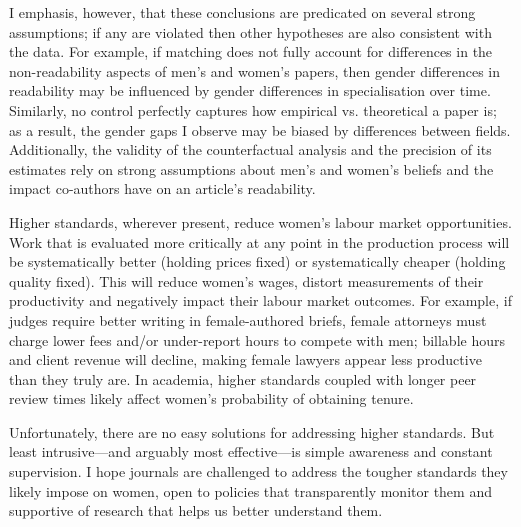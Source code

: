 I emphasis, however, that these conclusions are predicated on several strong assumptions; if any are violated then other hypotheses are also consistent with the data. For example, if matching does not fully account for differences in the non-readability aspects of men's and women's papers, then gender differences in readability may be influenced by gender differences in specialisation over time. Similarly, no control perfectly captures how empirical vs. theoretical a paper is; as a result, the gender gaps I observe may be biased by differences between fields. Additionally, the validity of the counterfactual analysis and the precision of its estimates rely on strong assumptions about men's and women's beliefs and the impact co-authors have on an article's readability.

Higher standards, wherever present, reduce women's labour market opportunities. Work that is evaluated more critically at any point in the production process will be systematically better (holding prices fixed) or systematically cheaper (holding quality fixed). This will reduce women's wages, distort measurements of their productivity and negatively impact their labour market outcomes. For example, if judges require better writing in female-authored briefs, female attorneys must charge lower fees and\slash or under-report hours to compete with men; billable hours and client revenue will decline, making female lawyers appear less productive than they truly are. In academia, higher standards coupled with longer peer review times likely affect women's probability of obtaining tenure.

Unfortunately, there are no easy solutions for addressing higher standards. But least intrusive---and arguably most effective---is simple awareness and constant supervision. I hope journals are challenged to address the tougher standards they likely impose on women, open to policies that transparently monitor them and supportive of research that helps us better understand them.


\ifappendixlast
    \begin{SingleSpace}
        \printbibliography[heading=subbibliography]
    \end{SingleSpace}

